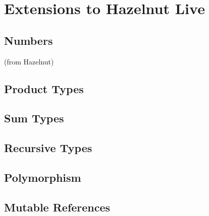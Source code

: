 \newcommand{\extensionsSec}{Extensions to Hazelnut Live}
\section{\protect\extensionsSec} %
\label{sec:extensions}

\subsection{Numbers}
(from Hazelnut)

\subsection{Product Types}

\subsection{Sum Types}

\subsection{Recursive Types}

\subsection{Polymorphism}

\subsection{Mutable References}

